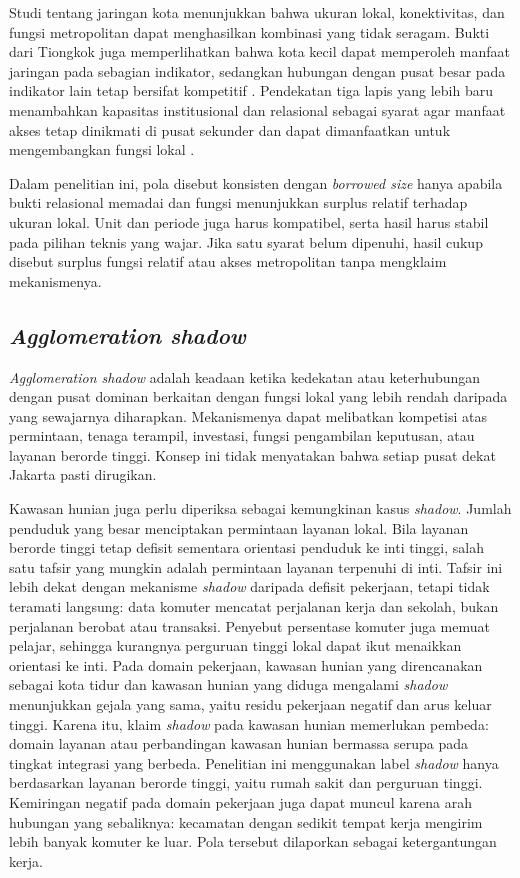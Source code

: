 \documentclass[12pt,a4paper,oneside,openany,indonesian]{report}
\begin{document}
Studi tentang jaringan kota menunjukkan bahwa ukuran lokal, konektivitas, dan fungsi metropolitan dapat menghasilkan kombinasi yang tidak seragam. Bukti dari Tiongkok juga memperlihatkan bahwa kota kecil dapat memperoleh manfaat jaringan pada sebagian indikator, sedangkan hubungan dengan pusat besar pada indikator lain tetap bersifat kompetitif \parencite{yangzhudu2022,zhaomiaoxi2022}. Pendekatan tiga lapis yang lebih baru menambahkan kapasitas institusional dan relasional sebagai syarat agar manfaat akses tetap dinikmati di pusat sekunder dan dapat dimanfaatkan untuk mengembangkan fungsi lokal \parencite{otsuka2025}.

Dalam penelitian ini, pola disebut konsisten dengan \textit{borrowed size} hanya apabila bukti relasional memadai dan fungsi menunjukkan surplus relatif terhadap ukuran lokal. Unit dan periode juga harus kompatibel, serta hasil harus stabil pada pilihan teknis yang wajar. Jika satu syarat belum dipenuhi, hasil cukup disebut surplus fungsi relatif atau akses metropolitan tanpa mengklaim mekanismenya.

\subsection{\textit{Agglomeration shadow}}

\textit{Agglomeration shadow} adalah keadaan ketika kedekatan atau keterhubungan dengan pusat dominan berkaitan dengan fungsi lokal yang lebih rendah daripada yang sewajarnya diharapkan. Mekanismenya dapat melibatkan kompetisi atas permintaan, tenaga terampil, investasi, fungsi pengambilan keputusan, atau layanan berorde tinggi. Konsep ini tidak menyatakan bahwa setiap pusat dekat Jakarta pasti dirugikan.

Kawasan hunian juga perlu diperiksa sebagai kemungkinan kasus \textit{shadow}. Jumlah penduduk yang besar menciptakan permintaan layanan lokal. Bila layanan berorde tinggi tetap defisit sementara orientasi penduduk ke inti tinggi, salah satu tafsir yang mungkin adalah permintaan layanan terpenuhi di inti. Tafsir ini lebih dekat dengan mekanisme \textit{shadow} daripada defisit pekerjaan, tetapi tidak teramati langsung: data komuter mencatat perjalanan kerja dan sekolah, bukan perjalanan berobat atau transaksi. Penyebut persentase komuter juga memuat pelajar, sehingga kurangnya perguruan tinggi lokal dapat ikut menaikkan orientasi ke inti. Pada domain pekerjaan, kawasan hunian yang direncanakan sebagai kota tidur dan kawasan hunian yang diduga mengalami \textit{shadow} menunjukkan gejala yang sama, yaitu residu pekerjaan negatif dan arus keluar tinggi. Karena itu, klaim \textit{shadow} pada kawasan hunian memerlukan pembeda: domain layanan atau perbandingan kawasan hunian bermassa serupa pada tingkat integrasi yang berbeda. Penelitian ini menggunakan label \textit{shadow} hanya berdasarkan layanan berorde tinggi, yaitu rumah sakit dan perguruan tinggi. Kemiringan negatif pada domain pekerjaan juga dapat muncul karena arah hubungan yang sebaliknya: kecamatan dengan sedikit tempat kerja mengirim lebih banyak komuter ke luar. Pola tersebut dilaporkan sebagai ketergantungan kerja.
\end{document}

